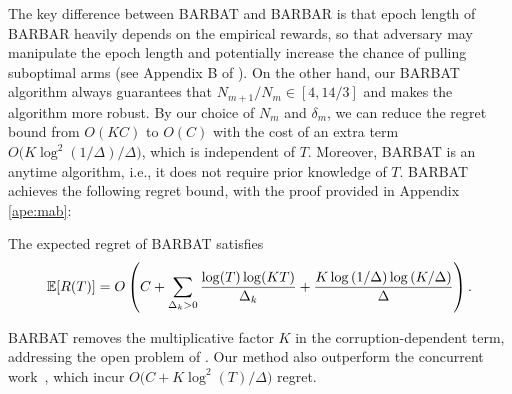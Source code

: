 
The key difference between BARBAT and BARBAR is that epoch length of BARBAR heavily depends on the empirical rewards, so that adversary may manipulate the epoch length and potentially increase the chance of pulling suboptimal arms (see Appendix B of \cite{gupta2019better}). On the other hand, our BARBAT algorithm always guarantees that $N_{m+1}/N_m\in[4,14/3]$ and makes the algorithm more robust. By our choice of $N_m$  and $\delta_m$, we can reduce the regret bound from $O(KC)$ to $O(C)$ with the cost of an extra term $O\bigl(K\log^2(1/\Delta)/\Delta\bigr)$, which is independent of $T$. Moreover, BARBAT is an anytime algorithm, i.e., it does not require prior knowledge of $T$.
BARBAT achieves the following regret bound, with the proof provided in Appendix \ref{ape:mab}:
\begin{theorem}
    \label{the:erb}
    The expected regret of BARBAT satisfies
    \[
    {\mathbb{E}}[R(T)] = O\left(C + \sum_{\Delta_k > 0}\frac{\log(T)\log(KT)}{\Delta_k} + \frac{K\log\left(1 / \Delta\right)\log\left(K / \Delta\right)}{\Delta}\right).
    \]
\end{theorem}
\begin{remark}
    BARBAT removes the multiplicative factor $K$ in the corruption-dependent term, addressing the open problem of \citet{gupta2019better}. Our method also outperform the concurrent work~\citep{ghaffari2024multi}, which incur $O\bigl(C+K\log^2(T)/\Delta\bigr)$ regret. %

\end{remark}
